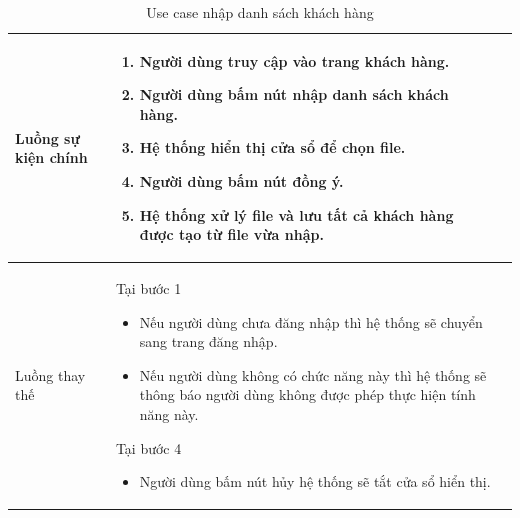 \documentclass[12pt,a4paper]{article}
\begin{document}
\begin{table}[H]
\begin{tabular}{|p{3.5cm}|p{11.5cm}|c|}
            Luồng sự kiện chính & \vspace{-.8cm}\begin{enumerate}
                                                    \item Người dùng truy cập vào trang khách hàng.
                                                    \item Người dùng bấm nút nhập danh sách khách hàng.
                                                    \item Hệ thống hiển thị cửa sổ để chọn file.
                                                    \item Người dùng bấm nút đồng ý.
                                                    \item Hệ thống xử lý file và lưu tất cả khách hàng được tạo từ file vừa nhập.
            \end{enumerate}
            \\
            \hline
            Luồng thay thế & Tại bước 1\newline
            \vspace{-.8cm}\begin{itemize}
                              \item Nếu người dùng chưa đăng nhập thì hệ thống sẽ chuyển sang trang đăng nhập.
                              \item Nếu người dùng không có chức năng này thì hệ thống sẽ thông báo người dùng không được phép thực hiện tính năng này.
            \end{itemize}
            Tại bước 4\newline
            \vspace{-.8cm}\begin{itemize}
                              \item Người dùng bấm nút hủy hệ thống sẽ tắt cửa sổ hiển thị.
            \end{itemize}
            \\ \hline
        \end{tabular}
        \caption{Use case nhập danh sách khách hàng}
    \end{table}

\end{document}
